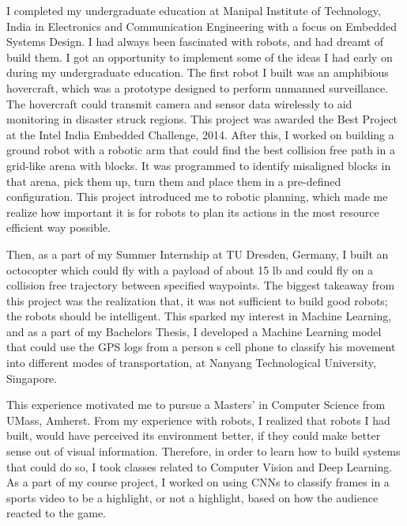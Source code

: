 \documentclass[10pt]{article}
\begin{document}
I completed my undergraduate education at Manipal Institute of Technology, India in Electronics and Communication Engineering with a focus on Embedded Systems Design. I had always been fascinated with robots, and had dreamt of build them. I got an opportunity to implement some of the ideas I had early on during my undergraduate education. The first robot I built was an amphibious hovercraft, which was a prototype designed to perform unmanned surveillance. The hovercraft could transmit camera and sensor data wirelessly to aid monitoring in disaster struck regions. This project was awarded the Best Project at the Intel India Embedded Challenge, 2014. After this, I worked on building a ground robot with a robotic arm that could find the best collision free path in a grid-like arena with blocks. It was programmed to identify misaligned blocks in that arena, pick them up, turn them and place them in a pre-defined configuration. This project introduced me to robotic planning, which made me realize how important it is for robots to plan its actions in the most resource efficient way possible.
\par
Then, as a part of my Summer Internship at TU Dresden, Germany, I built an octocopter which could fly with a payload of about 15 lb and could fly on a collision free trajectory between specified waypoints. The biggest takeaway from this project was the realization that, it was not sufficient to build good robots; the robots should be intelligent. This sparked my interest in Machine Learning, and as a part of my Bachelor\textquotesingle s Thesis, I developed a Machine Learning model that could use the GPS logs from a person \textquotesingle s cell phone to classify his movement into different modes of transportation, at Nanyang Technological University, Singapore. 
\par
This experience  motivated me to pursue a Masters' in Computer Science from UMass, Amherst. From my experience with robots, I realized that robots I had built, would have perceived its environment better, if they could make better sense out of visual information. Therefore, in order to learn how to build systems that could do so, I took classes related to Computer Vision and Deep Learning. As a part of my course project, I worked on using CNNs to classify frames in a sports video to be a highlight, or not a highlight, based on how the audience reacted to the game. 
\end{document}
